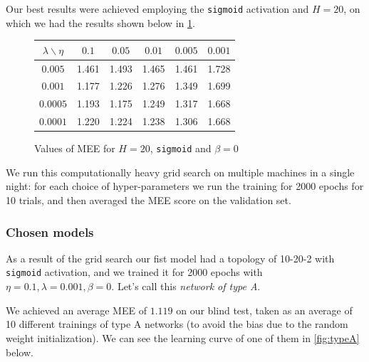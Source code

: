 Our best results were achieved employing the \texttt{sigmoid} activation and $H=20$, on which we had the results shown below in \cref{fig:gridSearch}.

\begin{figure}[h]
    \centering
    \begin{tabular}{|c||c|c|c|c|c|}
            \hline
              $\lambda \backslash \eta$ & $0.1$ & $0.05$ & $0.01$ & $0.005$ & $0.001$\\ \hline\hline
             $0.005$ & 1.461 & 1.493 & 1.465 & 1.461 & 1.728 \\ \hline
             $0.001$ & 1.177 & 1.226 & 1.276 & 1.349 & 1.699 \\ \hline
             $0.0005$ & 1.193 & 1.175 & 1.249 & 1.317 & 1.668 \\ \hline
             $0.0001$ & 1.220 & 1.224 & 1.238 & 1.306 & 1.668 \\ \hline
    \end{tabular}
    \caption{Values of MEE for $H=20$, \texttt{sigmoid} and $\beta=0$}
    \label{fig:gridSearch}
\end{figure}

We run this computationally heavy grid search on multiple machines in a single night: for each choice of hyper-parameters we run the training for 2000 epochs for 10 trials, and then averaged the MEE score on the validation set.

\subsubsection{Chosen models}

As a result of the grid search our fist model had a topology of 10-20-2 with \texttt{sigmoid} activation, and we trained it for 2000 epochs with $\eta=0.1,\lambda=0.001,\beta=0$. Let's call this \emph{network of type A}.

We achieved an average MEE of $1.119$ on our blind test, taken as an average of 10 different trainings of type A networks (to avoid the bias due to the random weight initialization). We can see the learning curve of one of them in \cref{fig:typeA} below.

